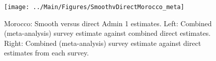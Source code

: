 \documentclass[12pt]{article}\usepackage[]{graphicx}\usepackage[]{color}
\newenvironment{knitrout}{}{} %
\begin{document}

\begin{knitrout}
\color{fgcolor}\begin{figure}[bht]

{\centering \texttt{[image: ../Main/Figures/SmoothvDirectMorocco\_meta]} 

}

\caption[Morocco]{Morocco: Smooth versus direct Admin 1 estimates. Left: Combined (meta-analysis) survey estimate against combined direct estimates. Right: Combined (meta-analysis) survey estimate against direct estimates from each survey.}\label{fig:unnamed-chunk-223}
\end{figure}


\end{knitrout}
\end{document}
